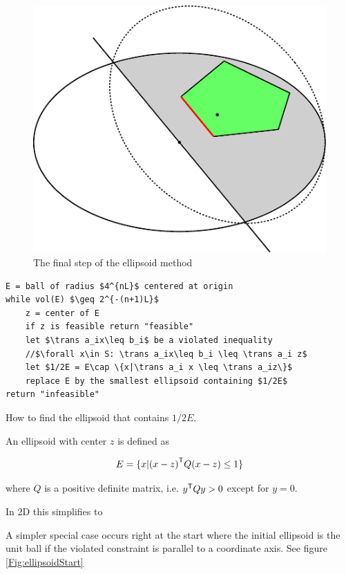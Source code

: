 \begin{figure}[hbt]
\begin{center}
\includegraphics{./images/ellipsoid}
\end{center}
\caption{The final step of the ellipsoid method}
\label{Fig:ellipsoidMovement}
\end{figure}

\begin{lstlisting}
E = ball of radius $4^{nL}$ centered at origin
while vol(E) $\geq 2^{-(n+1)L}$
	z = center of E
	if z is feasible return "feasible"
	let $\trans a_ix\leq b_i$ be a violated inequality
	//$\forall x\in S: \trans a_ix\leq b_i \leq \trans a_i z$
	let $1/2E = E\cap \{x|\trans a_i x \leq \trans a_iz\}$
	replace E by the smallest ellipsoid containing $1/2E$
return "infeasible"
\end{lstlisting}

How to find the ellipsoid that contains $1/2E$. 

\begin{Def}[Ellipsoid] An ellipsoid with center $z$ is defined as

\[E=\{x|{(x-z)}^\text{\upshape \sffamily T}Q(x-z)\leq 1\}\]

where $Q$ is a positive definite matrix, i.e. ${y}^\text{\upshape \sffamily T} Q y>0$ except for $y=0$.

In 2D this simplifies to

\end{Def}

A simpler special case occurs right at the start where the initial ellipsoid is the unit ball if the violated constraint is parallel to a coordinate axis. See figure \ref{Fig:ellipsoidStart}

